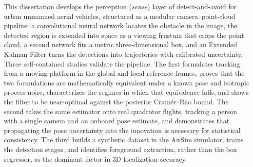 
This dissertation develops the perception (\emph{sense}) layer of detect-and-avoid for urban
unmanned aerial vehicles, structured as a modular camera--point-cloud pipeline: a convolutional
neural network locates the obstacle in the image, the detected region is extended into space as a
viewing frustum that crops the point cloud, a second network fits a metric three-dimensional box,
and an Extended Kalman Filter turns the detections into trajectories with calibrated uncertainty.
Three self-contained studies validate the pipeline. The first formulates tracking from a moving
platform in the global and local reference frames, proves that the two formulations are
mathematically equivalent under a known pose and isotropic process noise, characterizes the regimes
in which that equivalence fails, and shows the filter to be near-optimal against the posterior
Cram\'er--Rao bound. The second takes the same estimator onto real quadrotor flights, tracking a
person with a single camera and an onboard pose estimate, and demonstrates that propagating the
pose uncertainty into the innovation is necessary for statistical consistency. The third builds a
synthetic dataset in the AirSim simulator, trains the detection stages, and identifies foreground
extraction, rather than the box regressor, as the dominant factor in 3D localization accuracy.
